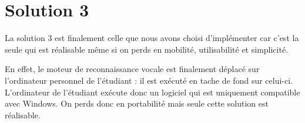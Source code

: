 \section{Solution 3}
La solution 3 est finalement celle que nous avons choisi d'implémenter car c'est la seule qui est réalisable même si on perds en mobilité, utilisabilité et simplicité.


En effet, le moteur de reconnaissance vocale est finalement déplacé sur l'ordinateur personnel de l'étudiant : il est exécuté en tache de fond sur celui-ci. L'ordinateur de l'étudiant exécute donc un logiciel qui est uniquement compatible avec Windows. On perds donc en portabilité mais seule cette solution est réalisable.
